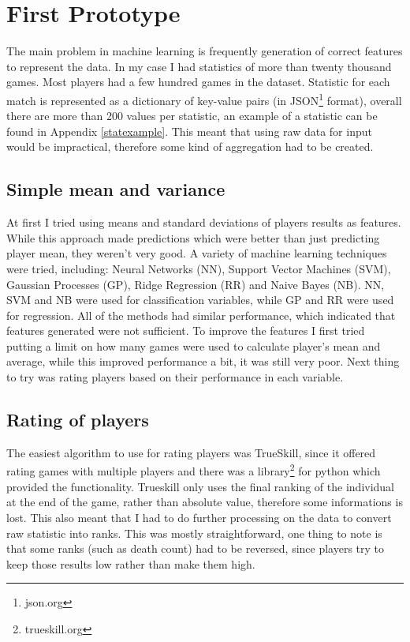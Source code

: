 \documentclass[12pt,a4paper]{book}
\begin{document}
\section{First Prototype}
The main problem in machine learning is frequently generation of correct features to represent the data.
In my case I had statistics of more than twenty thousand games.
Most players had a few hundred games in the dataset.
Statistic for each match is represented as a dictionary of key-value pairs (in JSON\footnote{json.org} format), overall there are more than 200 values per statistic, an example of a statistic can be found in Appendix \ref{statexample}.
This meant that using raw data for input would be impractical, therefore some kind of aggregation had to be created.

\subsection{Simple mean and variance}
At first I tried using means and standard deviations of players results as features.
While this approach made predictions which were better than just predicting player mean, they weren't very good.
A variety of machine learning techniques were tried, including: Neural Networks (NN), Support Vector Machines (SVM), Gaussian Processes (GP), Ridge Regression (RR) and Naive Bayes (NB).
NN, SVM and NB were used for classification variables, while GP and RR were used for regression.
All of the methods had similar performance, which indicated that features generated were not sufficient.
To improve the features I first tried putting a limit on how many games were used to calculate player's mean and average, while this improved performance a bit, it was still very poor.
Next thing to try was rating players based on their performance in each variable.

\subsection{Rating of players}
The easiest algorithm to use for rating players was TrueSkill, since it offered rating games with multiple players and there was a library\footnote{trueskill.org} for python which provided the functionality.
Trueskill only uses the final ranking of the individual at the end of the game, rather than absolute value, therefore some informations is lost.
This also meant that I had to do further processing on the data to convert raw statistic into ranks.
This was mostly straightforward, one thing to note is that some ranks (such as death count) had to be reversed, since players try to keep those results low rather than make them high.
\end{document}
